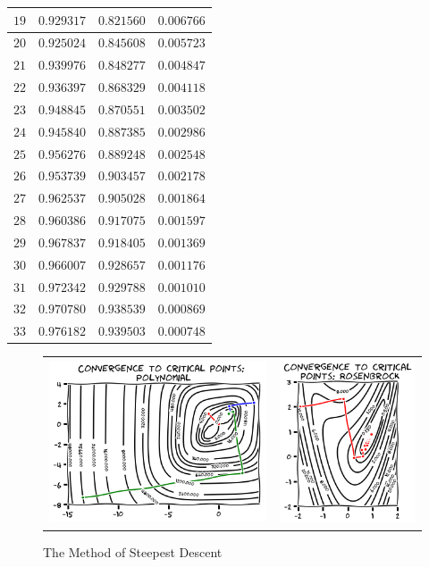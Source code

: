 \begin{example}
\begin{center}
\begin{tabular}{|r|r|r|r|}
$19$ & $0.929317$ & $0.821560$ & $0.006766$ \\ \hline 
$20$ & $0.925024$ & $0.845608$ & $0.005723$ \\ \hline 
$21$ & $0.939976$ & $0.848277$ & $0.004847$ \\ \hline 
$22$ & $0.936397$ & $0.868329$ & $0.004118$ \\ \hline 
$23$ & $0.948845$ & $0.870551$ & $0.003502$ \\ \hline 
$24$ & $0.945840$ & $0.887385$ & $0.002986$ \\ \hline 
$25$ & $0.956276$ & $0.889248$ & $0.002548$ \\ \hline 
$26$ & $0.953739$ & $0.903457$ & $0.002178$ \\ \hline 
$27$ & $0.962537$ & $0.905028$ & $0.001864$ \\ \hline 
$28$ & $0.960386$ & $0.917075$ & $0.001597$ \\ \hline 
$29$ & $0.967837$ & $0.918405$ & $0.001369$ \\ \hline 
$30$ & $0.966007$ & $0.928657$ & $0.001176$ \\ \hline 
$31$ & $0.972342$ & $0.929788$ & $0.001010$ \\ \hline 
$32$ & $0.970780$ & $0.938539$ & $0.000869$ \\ \hline 
$33$ & $0.976182$ & $0.939503$ & $0.000748$ \\ \hline 
\end{tabular}
\end{center}
\end{example}

\begin{figure}[ht!]
\begin{tabular}{cc}
\includegraphics[width=0.62\linewidth]{images/convergenceSteepest.png} &
\includegraphics[width=0.38\linewidth]{images/SDR3.png}
\end{tabular}
\caption{The Method of Steepest Descent}
\label{figure:SteepestConvergence}
\end{figure}

